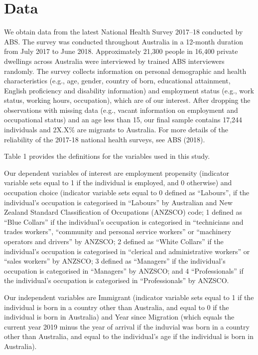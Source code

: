 \section{Data}
\label{sec:Data}

We obtain data from the latest National Health Survey 2017--18 conducted by ABS.
The survey was conducted throughout Australia in a 12-month duration from July 2017 to June 2018.
Approximately 21,300 people in 16,400 private dwellings across Australia were interviewed by trained ABS interviewers randomly.
The survey collects information on personal demographic and health characteristics (e.g., age, gender, country of born, educational attainment, English proficiency and disability information) and employment status (e.g., work status, working hours, occupation), which are of our interest.
After dropping the observations with missing data (e.g., vacant information on employment and occupational status) and an age less than 15, our final sample contains 17,244 individuals and 2X.X\% are migrants to Australia.
For more details of the reliability of the 2017-18 national health surveys, see ABS (2018).

Table 1 provides the definitions for the variables used in this study.

Our dependent variables of interest are employment propensity (indicator variable sets equal to 1 if the individual is employed, and 0 otherwise) and occupation choice (indicator variable sets equal to 0 defined as “Labours”, if the individual’s occupation is categorised in “Labours” by Australian and New Zealand Standard Classification of Occupations (ANZSCO) code; 1 defined  as “Blue Collars” if the individual’s occupation is categorised in “technicians and trades workers”, “community and personal service workers” or “machinery operators and drivers” by ANZSCO; 2 defined as “White Collars” if the individual’s occupation is categorised in “clerical and administrative workers” or “sales workers” by ANZSCO; 3 defined as “Managers” if the individual’s occupation is categorised in “Managers” by ANZSCO; and 4 “Professionals” if the individual’s occupation is categorised in “Professionals” by ANZSCO.

Our independent variables are Immigrant (indicator variable sets equal to 1 if the individual is born in a country other than Australia, and equal to 0 if the individual is born in Australia) and Year since Migration (which equals the current year 2019 minus the year of arrival if the induvial was born in a country other than Australia, and equal to the individual’s age if the individual is born in Australia).

